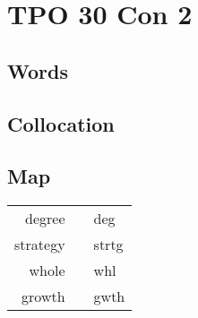 \section{TPO 30 Con 2}

\subsection{Words}

\subsection{Collocation}

\subsection{Map}

\begin{tabular}{rc@{\quad$\to$\quad}l}
    degree   &  & deg   \\
    strategy &  & strtg \\
    whole    &  & whl   \\
    growth   &  & gwth  \\
\end{tabular}

\newpage
